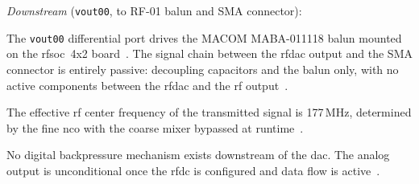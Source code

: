 \textit{Downstream} (\texttt{vout00}, to RF-01 balun and SMA
connector):
\begin{tightemize}
  \item The \texttt{vout00} differential port drives the MACOM
        MABA-011118 balun mounted on the \ac{rfsoc}~4x2
        board~\cite{RealDigital_A6}.
        The signal chain between the \ac{rfdac} output and the
        SMA connector is entirely passive: decoupling capacitors
        and the balun only, with no active components between
        the \ac{rfdac} and the \ac{rf} output~\cite{RealDigital_A6}.
  \item The effective \ac{rf} center frequency of the transmitted
        signal is 177\,MHz, determined by the fine \ac{nco}
        with the coarse mixer bypassed at runtime~\cite{AMD_PG269}.
  \item No digital backpressure mechanism exists downstream of
        the \ac{dac}.
        The analog output is unconditional once the \ac{rfdc} is
        configured and data flow is active~\cite{AMD_PG269}.
\end{tightemize}


\FloatBarrier
